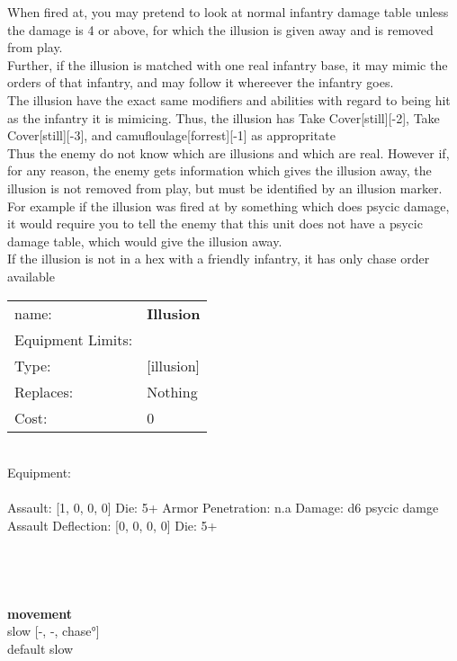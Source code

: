 \noindent When fired at, you may pretend to look at normal infantry damage table unless the damage is 4 or above, for which the illusion is given away and is removed from play.\\ 
Further, if the illusion is matched with one real infantry base, it may mimic the orders of that infantry, and may follow it whereever the infantry goes. \\ 
The illusion have the exact same modifiers and abilities with regard to being hit as the infantry it is mimicing. Thus, the illusion has Take Cover[still][-2], Take Cover[still][-3], and camufloulage[forrest][-1] as appropritate \\ 
 Thus the enemy do not know which are illusions and which are real. However if, for any reason, the enemy gets information which gives the illusion away, the illusion is not removed from play, but must be identified by an illusion marker. For example if the illusion was fired at by something which does psycic damage, it would require you to tell the enemy that this unit does not have a psycic damage table, which would give the illusion away.\\ 
If the illusion is not in a hex with a friendly infantry, it has only chase order available\\ 


\noindent
\begin{tabular}{ll}
name: &{\bf Illusion } \\
Equipment Limits: & \\
Type: &[illusion] \\
Replaces: &Nothing \\
Cost: & 0\\
\end{tabular}
\ \\
Equipment:  \\
\ \\
Assault: [1, 0, 0, 0] Die: 5+ Armor Penetration: n.a Damage: d6 psycic damge \\
Assault Deflection: [0, 0, 0, 0] Die: 5+\\
\indent  
\ \\

\ \\
 
\ \\



\ \\ {\bf movement } \\
slow [-, -, chase°] \\
default slow \\


